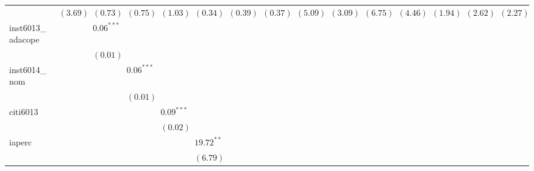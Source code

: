 \begin{table}
\begin{center}
\begin{tabular}{l c c c c c c c c c c c c c c }
                                                          & $(3.69)$      & $(0.73)$     & $(0.75)$     & $(1.03)$     & $(0.34)$     & $(0.39)$     & $(0.37)$     & $(5.09)$      & $(3.09)$      & $(6.75)$      & $(4.46)$      & $(1.94)$      & $(2.62)$      & $(2.27)$      \\
inst6013\_adacope                                         &               & $0.06^{***}$ &              &              &              &              &              &               &               &               &               &               &               &               \\
                                                          &               & $(0.01)$     &              &              &              &              &              &               &               &               &               &               &               &               \\
inst6014\_nom                                             &               &              & $0.06^{***}$ &              &              &              &              &               &               &               &               &               &               &               \\
                                                          &               &              & $(0.01)$     &              &              &              &              &               &               &               &               &               &               &               \\
citi6013                                                  &               &              &              & $0.09^{***}$ &              &              &              &               &               &               &               &               &               &               \\
                                                          &               &              &              & $(0.02)$     &              &              &              &               &               &               &               &               &               &               \\
iaperc                                                    &               &              &              &              & $19.72^{**}$ &              &              &               &               &               &               &               &               &               \\
                                                          &               &              &              &              & $(6.79)$     &              &              &               &               &               &               &               &               &               \\

\end{tabular}
\end{center}
\end{table}
